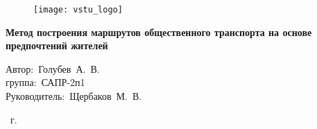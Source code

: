 \begin{frame}
    \begin{figure}
        \hspace*{-320pt}\texttt{[image: vstu\_logo]}
    \end{figure}
    \vspace{2em}
    \begin{center}
        \large
        \textbf{Метод построения маршрутов общественного транспорта на основе предпочтений жителей}\\
    \end{center}
    \vspace{2em}
    \begin{flushleft}
        \hspace{12em}Автор:~Голубев~А.~В.\\
        \hspace{12em}группа:~САПР-2п1\\
        \hspace{12em}Руководитель:~Щербаков~М.~В.
    \end{flushleft}
    \vspace{3em}
     \the\year\ г.
\end{frame}


